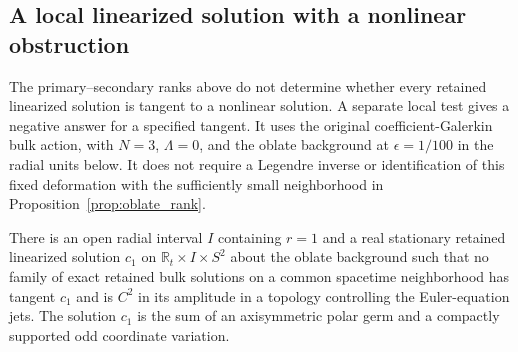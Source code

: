 \subsection{A local linearized solution with a nonlinear obstruction}
\label{sec:oblate_local_obstruction}

The primary--secondary ranks above do not determine whether every retained linearized solution is tangent to a nonlinear solution. A separate local test gives a negative answer for a specified tangent. It uses the original coefficient-Galerkin bulk action, with $N=3$, $\Lambda=0$, and the oblate background at $\epsilon=1/100$ in the radial units below. It does not require a Legendre inverse or identification of this fixed deformation with the sufficiently small neighborhood in Proposition~\ref{prop:oblate_rank}.

\begin{proposition}\label{prop:oblate_local_obstruction}
There is an open radial interval $I$ containing $r=1$ and a real stationary retained linearized solution $c_1$ on $\mathbb R_t\times I\times S^2$ about the oblate background such that no family of exact retained bulk solutions on a common spacetime neighborhood has tangent $c_1$ and is $C^2$ in its amplitude in a topology controlling the Euler-equation jets. The solution $c_1$ is the sum of an axisymmetric polar germ and a compactly supported odd coordinate variation.
\end{proposition}

